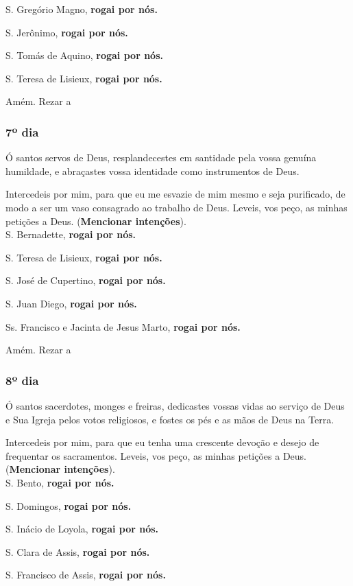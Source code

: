 \documentclass[a4paper,14pt]{extarticle} \usepackage[utf8]{inputenc}
\begin{document}
S. Gregório Magno, \textbf{rogai por nós.}

S. Jerônimo, \textbf{rogai por nós.}

S. Tomás de Aquino, \textbf{rogai por nós.}

S. Teresa de Lisieux, \textbf{rogai por nós.}

Amém. Rezar a 
\subsubsection{7º dia}

Ó santos servos de Deus, resplandecestes em santidade pela vossa genuína humildade, e abraçastes vossa identidade como instrumentos de Deus.

Intercedeis por mim, para que eu me esvazie de mim mesmo e seja purificado, de modo a ser um vaso consagrado ao trabalho de Deus. Leveis, vos peço, as minhas petições a Deus. (\textbf{Mencionar intenções}).\\

S. Bernadette, \textbf{rogai por nós.}

S. Teresa de Lisieux, \textbf{rogai por nós.}

S. José de Cupertino, \textbf{rogai por nós.}

S. Juan Diego, \textbf{rogai por nós.}

Ss. Francisco e Jacinta de Jesus Marto, \textbf{rogai por nós.}

Amém. Rezar a 
\subsubsection{8º dia}

Ó santos sacerdotes, monges e freiras, dedicastes vossas vidas ao serviço de Deus e Sua Igreja pelos votos religiosos, e fostes os pés e as mãos de Deus na Terra.

Intercedeis por mim, para que eu tenha uma crescente devoção e desejo de frequentar os sacramentos. Leveis, vos peço, as minhas petições a Deus. (\textbf{Mencionar intenções}).\\

S. Bento, \textbf{rogai por nós.}

S. Domingos, \textbf{rogai por nós.}

S. Inácio de Loyola, \textbf{rogai por nós.}

S. Clara de Assis, \textbf{rogai por nós.}

S. Francisco de Assis, \textbf{rogai por nós.}
\end{document}
